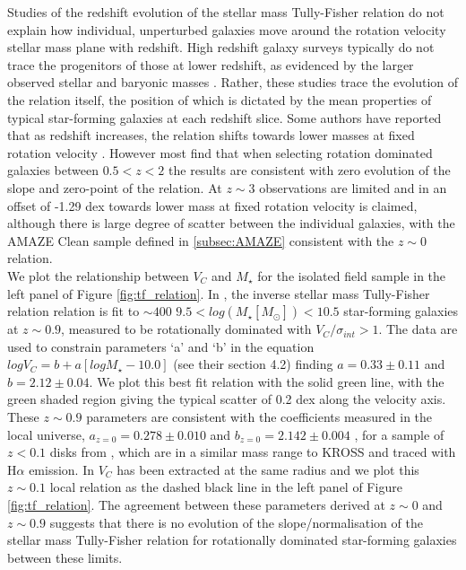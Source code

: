 \documentclass[fleqn,usenatbib]{mn2e}
\begin{document}
Studies of the redshift evolution of the stellar mass Tully-Fisher relation do not explain how individual, unperturbed galaxies move around the rotation velocity stellar mass plane with redshift. 
High redshift galaxy surveys typically do not trace the progenitors of those at lower redshift, as evidenced by the larger observed stellar and baryonic masses \citep[e.g.][]{Cresci2009,Reyes2011,Wisnioski2015,Ubler2017}.
Rather, these studies trace the evolution of the relation itself, the position of which is dictated by the mean properties of typical star-forming galaxies at each redshift slice.
Some authors have reported that as redshift increases, the relation shifts towards lower masses at fixed rotation velocity \citep[e.g.][]{Puech2008,Cresci2009,Puech2010,Straatman2017,Ubler2017}.
However most find that when selecting rotation dominated galaxies between $0.5 < z < 2$ \citep[e.g.][]{Flores2006,Miller2011,Kassin2012,Miller2012,Vergani2012,Miller2014,Contini2015a,Molina2016,DiTeodoro2016,Simons2016,Pelliccia2017,Harrison2017} the results are consistent with zero evolution of the slope and zero-point of the relation.
At $z\sim 3$ observations are limited and in \cite{Gnerucci2011} an offset of -1.29 dex towards lower mass at fixed rotation velocity is claimed, although there is large degree of scatter between the individual galaxies, with the AMAZE Clean sample defined in \cref{subsec:AMAZE} consistent with the $z\sim0$ relation. \\

We plot the relationship between $V_{C}$ and $M_{\star}$ for the isolated field sample in the left panel of Figure \ref{fig:tf_relation}.
In \cite{Harrison2017}, the inverse stellar mass Tully-Fisher relation relation is fit to $\sim400$ $9.5 < log(M_{\star}[M_{\odot}]) < 10.5$ star-forming galaxies at $z\sim0.9$, measured to be rotationally dominated with $V_{C}/\sigma_{int} > 1$.
The data are used to constrain parameters `a' and `b' in the equation $logV_{C}=b+a[logM_{\star} - 10.0]$ (see their section 4.2) finding $a = 0.33 \pm 0.11$ and $b = 2.12 \pm 0.04$.
We plot this best fit relation with the solid green line, with the green shaded region giving the typical scatter of 0.2 dex along the velocity axis.
These $z\sim0.9$ parameters are consistent with the coefficients measured in the local universe, $a_{z=0} = 0.278 \pm 0.010$ and $b_{z=0} = 2.142 \pm 0.004$ , for a sample of $z<0.1$ disks from \cite{Reyes2011}, which are in a similar mass range to KROSS and traced with H$\alpha$ emission.
In \citep{Reyes2011} $V_{C}$ has been extracted at the same radius and we plot this $z\sim 0.1$ local relation as the dashed black line in the left panel of Figure \ref{fig:tf_relation}.
The agreement between these parameters derived at $z\sim0$ and $z\sim0.9$ suggests that there is no evolution of the slope/normalisation of the stellar mass Tully-Fisher relation for rotationally dominated star-forming galaxies between these limits. \\
\end{document}
